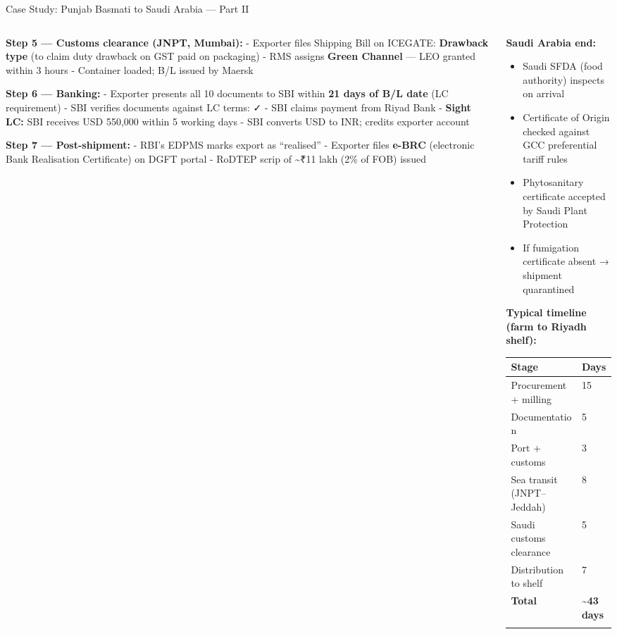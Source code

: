 \documentclass[
  ignorenonframetext,
  aspectratio=169,
]{beamer}
\makeatletter
\providecommand{\tightlist}{%
  \setlength{\itemsep}{0pt}\setlength{\parskip}{0pt}}
\let\quarto@originallabel\label
\DeclareRobustCommand*{\label}[1]{\quarto@originallabel{#1}}
\makeatother
\begin{document}
\begin{frame}
\begin{block}{Case Study: Punjab Basmati to Saudi Arabia --- Part II}
\label{case-study-punjab-basmati-to-saudi-arabia-part-ii}
\begin{columns}[T]
\begin{column}{0.55\linewidth}
\textbf{Step 5 --- Customs clearance (JNPT, Mumbai):} - Exporter files
Shipping Bill on ICEGATE: \textbf{Drawback type} (to claim duty drawback
on GST paid on packaging) - RMS assigns \textbf{Green Channel} --- LEO
granted within 3 hours - Container loaded; B/L issued by Maersk

\textbf{Step 6 --- Banking:} - Exporter presents all 10 documents to SBI
within \textbf{21 days of B/L date} (LC requirement) - SBI verifies
documents against LC terms: ✓ - SBI claims payment from Riyad Bank -
\textbf{Sight LC:} SBI receives USD 550,000 within 5 working days - SBI
converts USD to INR; credits exporter account

\textbf{Step 7 --- Post-shipment:} - RBI's EDPMS marks export as
``realised'' - Exporter files \textbf{e-BRC} (electronic Bank
Realisation Certificate) on DGFT portal - RoDTEP scrip of
\textasciitilde₹11 lakh (2\% of FOB) issued
\end{column}

\begin{column}{0.45\linewidth}
\textbf{Saudi Arabia end:}

\begin{itemize}
\tightlist
\item
  Saudi SFDA (food authority) inspects on arrival
\item
  Certificate of Origin checked against GCC preferential tariff rules
\item
  Phytosanitary certificate accepted by Saudi Plant Protection
\item
  If fumigation certificate absent → shipment quarantined
\end{itemize}

\textbf{Typical timeline (farm to Riyadh shelf):}

\begin{longtable}[]{@{}ll@{}}
\toprule\noalign{}
Stage & Days \\
\midrule\noalign{}
\endhead
Procurement + milling & 15 \\
Documentation & 5 \\
Port + customs & 3 \\
Sea transit (JNPT--Jeddah) & 8 \\
Saudi customs clearance & 5 \\
Distribution to shelf & 7 \\
\textbf{Total} & \textbf{\textasciitilde43 days} \\
\bottomrule\noalign{}
\end{longtable}
\end{column}
\end{columns}
\end{block}
\end{frame}
\end{document}
